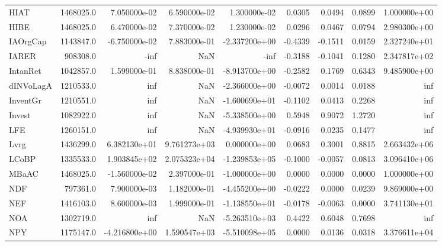 \begin{tabular}{lrrrrrrrr}
HIAT      &  1468025.0 &  7.050000e-02 &  6.590000e-02 &  1.300000e-02 &     0.0305 &     0.0494 &     0.0899 &  1.000000e+00 \\
HIBE      &  1468025.0 &  6.470000e-02 &  7.370000e-02 &  1.230000e-02 &     0.0296 &     0.0467 &     0.0794 &  2.980300e+00 \\
IAOrgCap  &  1143847.0 & -6.750000e-02 &  7.883000e-01 & -2.337200e+00 &    -0.4339 &    -0.1511 &     0.0159 &  2.327240e+01 \\
IARER     &   908308.0 &          -inf &           NaN &          -inf &    -0.3188 &    -0.1041 &     0.1280 &  2.347817e+02 \\
IntanRet  &  1042857.0 &  1.599000e-01 &  8.838000e-01 & -8.913700e+00 &    -0.2582 &     0.1769 &     0.6343 &  9.485900e+00 \\
dINVoLagA &  1210533.0 &           inf &           NaN & -2.366000e+00 &    -0.0072 &     0.0014 &     0.0188 &           inf \\
InventGr  &  1210551.0 &           inf &           NaN & -1.600690e+01 &    -0.1102 &     0.0413 &     0.2268 &           inf \\
Invest    &  1082922.0 &           inf &           NaN & -5.338500e+00 &     0.5948 &     0.9072 &     1.2720 &           inf \\
LFE       &  1260151.0 &           inf &           NaN & -4.939930e+01 &    -0.0916 &     0.0235 &     0.1477 &           inf \\
Lvrg      &  1436299.0 &  6.382130e+01 &  9.761273e+03 &  0.000000e+00 &     0.0683 &     0.3001 &     0.8815 &  2.663432e+06 \\
LCoBP     &  1335533.0 &  1.903845e+02 &  2.075323e+04 & -1.239853e+05 &    -0.1000 &    -0.0057 &     0.0813 &  3.096410e+06 \\
MBaAC     &  1468025.0 & -1.560000e-02 &  2.397000e-01 & -1.000000e+00 &     0.0000 &     0.0000 &     0.0000 &  1.000000e+00 \\
NDF       &   797361.0 &  7.900000e-03 &  1.182000e-01 & -4.455200e+00 &    -0.0222 &     0.0000 &     0.0239 &  9.869000e+00 \\
NEF       &  1416103.0 &  8.600000e-03 &  1.999000e-01 & -1.138550e+01 &    -0.0178 &    -0.0063 &     0.0000 &  3.741130e+01 \\
NOA       &  1302719.0 &           inf &           NaN & -5.263510e+03 &     0.4422 &     0.6048 &     0.7698 &           inf \\
NPY       &  1175147.0 & -4.216800e+00 &  1.590547e+03 & -5.510098e+05 &     0.0000 &     0.0136 &     0.0318 &  3.376611e+04 \\

\end{tabular}
